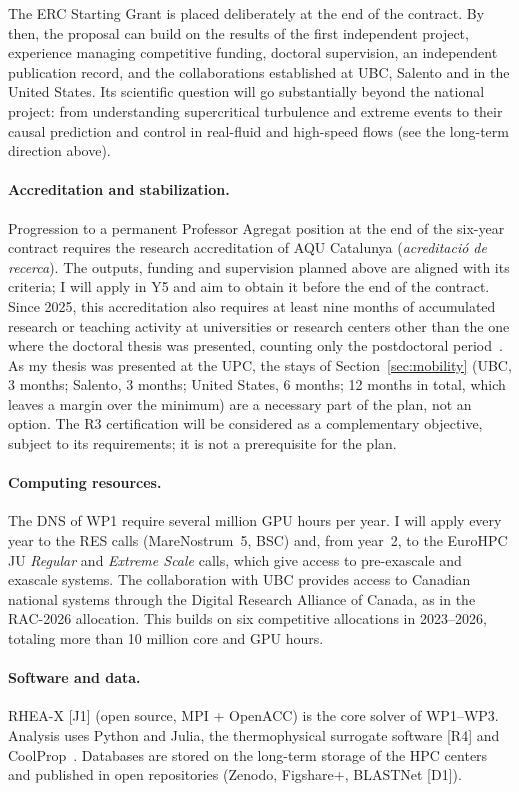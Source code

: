 \documentclass[11pt]{article}
\begin{document}
The ERC Starting Grant is placed deliberately at the end of the contract. By then, the
proposal can build on the results of the first independent project, experience managing
competitive funding, doctoral supervision, an independent publication record, and the
collaborations established at UBC, Salento and in the United States. Its scientific question
will go substantially beyond the national project: from understanding supercritical turbulence
and extreme events to their causal prediction and control in real-fluid and high-speed flows
(see the long-term direction above).

\paragraph{Accreditation and stabilization.} Progression to a permanent Professor Agregat
position at the end of the six-year contract requires the research accreditation of AQU
Catalunya (\emph{acreditaci\'o de recerca}). The outputs, funding and supervision planned
above are aligned with its criteria; I will apply in Y5 and aim to obtain it before the end
of the contract. Since 2025, this accreditation also requires at least nine months of
accumulated research or teaching activity at universities or research centers other than the
one where the doctoral thesis was presented, counting only the postdoctoral
period~\cite{AQU2025}. As my thesis was presented at the UPC, the stays of
Section~\ref{sec:mobility} (UBC, 3 months; Salento, 3 months; United States, 6 months;
12 months in total, which leaves a margin over the minimum) are a necessary part of the plan, not an option. The R3 certification will be considered as a complementary objective, subject
to its requirements; it is not a prerequisite for the plan.

\paragraph{Computing resources.} The DNS of WP1 require several million GPU hours per year. I will apply every year to the RES calls (MareNostrum~5, BSC) and, from year~2, to
the EuroHPC JU \emph{Regular} and \emph{Extreme Scale} calls, which give access to
pre-exascale and exascale systems. The collaboration with UBC provides access to Canadian
national systems through the Digital Research Alliance of Canada, as in the RAC-2026
allocation. This builds on six competitive allocations in 2023--2026, totaling more than 10
million core and GPU hours.

\paragraph{Software and data.} RHEA-X [J1] (open source, MPI + OpenACC) is the core solver of
WP1--WP3. Analysis uses Python and Julia, the thermophysical surrogate software [R4] and
CoolProp~\cite{CoolProp2014}. Databases are stored on the long-term storage of the HPC centers
and published in open repositories (Zenodo, Figshare+, BLASTNet [D1]).
\end{document}
